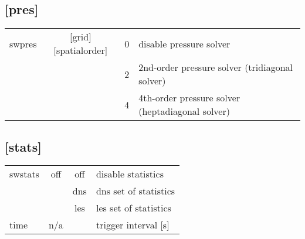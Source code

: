\documentclass[a4paper,10pt]{extarticle}
\begin{document}
\subsection*{[pres]}
\tablelasttail{\hline}
\begin{supertabular}{lccl}
swpres        & [grid][spatialorder]  & 0 & disable pressure solver \\
              &                       & 2 & 2nd-order pressure solver (tridiagonal solver) \\
              &                       & 4 & 4th-order pressure solver (heptadiagonal solver) \\
\end{supertabular}
\subsection*{[stats]}
\tablelasttail{\hline}
\begin{supertabular}{lccl}
swstats       & off   & off & disable statistics \\
              &       & dns & dns set of statistics \\
              &       & les & les set of statistics \\
time          & n/a   &     & trigger interval [s] \\
\end{supertabular}
\end{document}
